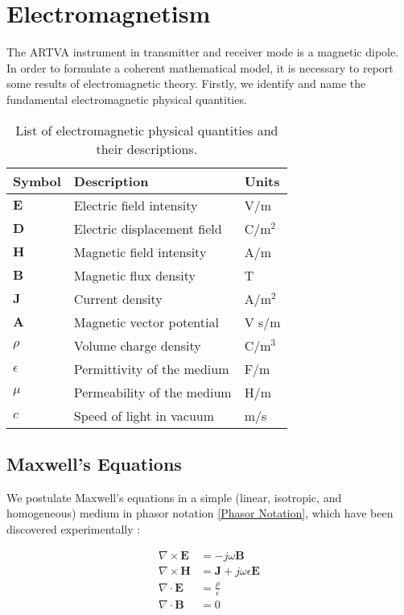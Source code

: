 \chapter{Electromagnetism}

The ARTVA instrument in transmitter and receiver 
mode is a magnetic dipole. In order to formulate 
a coherent mathematical model, it is necessary to 
report some results of electromagnetic theory. 
Firstly, we identify and name the fundamental 
electromagnetic physical quantities.

\begin{table}[h!]
    \centering
    \begin{tabular}{lll}
        \hline
        Symbol & Description & Units \\
        \hline
        $\mathbf{E}$ & Electric field intensity & V/m \\
        $\mathbf{D}$ & Electric displacement field & C/m$^2$ \\
        $\mathbf{H}$ & Magnetic field intensity & A/m \\
        $\mathbf{B}$ & Magnetic flux density & T \\
        $\mathbf{J}$ & Current density & A/m$^2$ \\
        $\mathbf{A}$ & Magnetic vector potential & V s/m \\
        $\rho$ & Volume charge density & C/m$^3$ \\
        $\epsilon$ & Permittivity of the medium & F/m \\
        $\mu$ & Permeability of the medium & H/m \\
        $c$ & Speed of light in vacuum & m/s \\
        \hline
    \end{tabular}
    \caption{List of electromagnetic physical 
    quantities and their descriptions.}
    \label{tab:symbols}
\end{table}

\section{Maxwell's Equations}

We postulate Maxwell's equations in a simple 
(linear, isotropic, and homogeneous) medium in 
phasor notation \ref{Phasor Notation}, which have 
been discovered experimentally \cite{book-magnetism}:

\begin{align}
    \nabla \times \mathbf{E} &= -j\omega \mathbf{B} 
    \label{eq:curl_E} \\
    \nabla \times \mathbf{H} &= \mathbf{J} + j\omega 
    \epsilon \mathbf{E} \label{eq:curl_H} \\
    \nabla \cdot \mathbf{E} &= \frac{\rho}{\epsilon} 
    \label{eq:E} \\
    \nabla \cdot \mathbf{B} &= 0 \label{eq:B}
\end{align}

